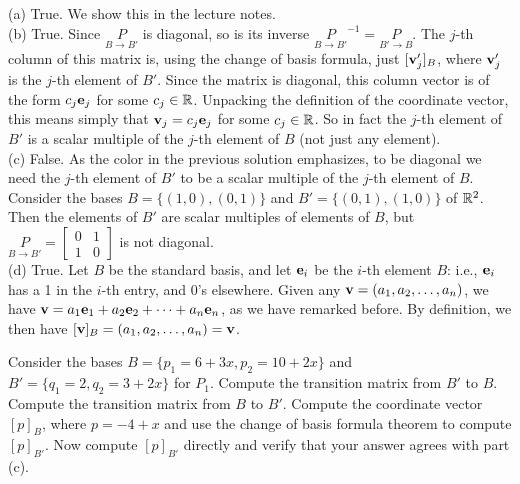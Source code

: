 \begin{solution}
\noindent
(a) True. We show this in the lecture notes. 
\\
(b) True. Since $\underset{B\rightarrow B'}{P}$ is diagonal, so is its inverse $\underset{B\rightarrow B'}{P}^{-1}=\underset{B'\rightarrow B}{P}$. The $j$-th column of this matrix is, using the change of basis formula, just $[{\mathbf v}_j']_B$, where ${\mathbf v}_j'$ is the $j$-th element of $B'$. Since the matrix is diagonal, this column vector is of the form $c_j{\mathbf e}_j$ for some $c_j\in{\mathbb R}$. Unpacking the definition of the coordinate vector, this means simply that ${\mathbf v}_j=c_j{\mathbf e}_j$ for some $c_j\in {\mathbb R}$. So in fact the $j$-th element of $B'$ is a scalar multiple {\color{red}of the $j$-th element of $B$} (not just any element). 
\\
(c) False. As the color in the previous solution emphasizes, to be diagonal we need the $j$-th element of $B'$ to be a scalar multiple of the $j$-th element of $B$. Consider the bases $B=\{(1,0), (0,1)\}$ and $B'=\{(0,1), (1,0)\}$ of ${\mathbb R}^2$. Then the elements of $B'$ are scalar multiples of elements of $B$, but $\underset{B\rightarrow B'}{P}=\begin{bmatrix}
0&1\\
1&0
\end{bmatrix}$ is not diagonal.  
\\
(d) True. Let $B$ be the standard basis, and let ${\mathbf e}_i$ be the $i$-th element $B$: i.e., ${\mathbf e}_i$ has a 1 in the $i$-th entry, and 0's elsewhere. Given any ${\mathbf v}=(a_1,a_2,\dots, a_n)$, we have ${\mathbf v}=a_1{\mathbf e}_1+a_2{\mathbf e}_2+\cdots +a_n{\mathbf e}_n$, as we have remarked before. By definition, we then have $[{\mathbf v}]_B=(a_1,a_2,\dots, a_n)={\mathbf v}$. 
\end{solution}
\ii Consider the bases $B = \{p_1 = 6 +3x, p_2 = 10+2x\}$ and $B'=\{q_1=2, q_2=3+2x\}$ for $P_1$.
\bb
\ii Compute the transition matrix from $B'$ to $B$.
\ii Compute the transition matrix from $B$ to $B'$.
\ii Compute the coordinate vector $[p]_B$, where $p = -4 +x$ and use the change of basis formula theorem to compute $[p]_{B'}$.
\ii Now compute $[p]_{B'}$ directly and verify that your answer agrees with part (c). 
\ee
